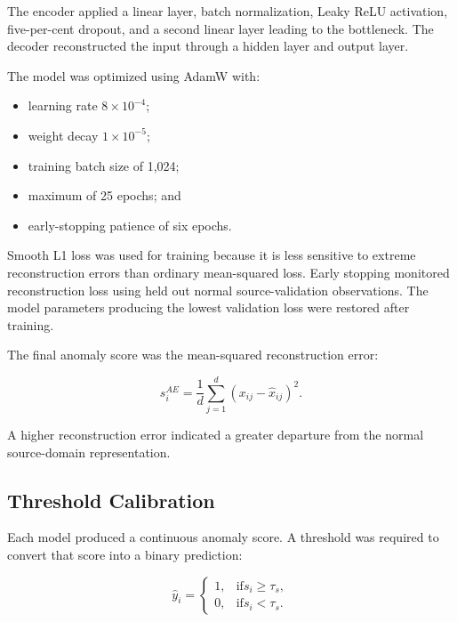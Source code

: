 The encoder applied a linear layer, batch normalization, Leaky ReLU activation, five-per-cent dropout, and a second linear layer leading to the bottleneck. The decoder reconstructed the input through a hidden layer and output layer.

The model was optimized using AdamW with:

\begin{itemize}
       \item learning rate  \(8\times10^{-4}\);
       \item weight decay \(1\times10^{-5}\);
       \item training batch size of 1,024;
       \item maximum of 25 epochs; and
       \item early-stopping patience of six epochs.
\end{itemize}

Smooth L1 loss was used for training because it is less sensitive to extreme reconstruction errors than ordinary mean-squared  loss.
Early stopping monitored reconstruction loss using held out normal source-validation observations. The model parameters producing the lowest validation loss were restored after training.

The final anomaly score was the mean-squared reconstruction error:

\begin{equation}
       s_i^{AE} =
       \frac{1}{d}
       \sum_{j=1}^{d}
       \left(x_{ij}-\hat{x}_{ij}\right)^2.
\label{eq:method-ae-score}
\end{equation}

A higher reconstruction error indicated a greater departure from the normal source-domain representation.

\subsection{Threshold Calibration}
\label{subsec:method-threshold-calibration}

Each model produced a continuous anomaly score. A threshold was required to convert that score into a binary prediction:

\begin{equation}
       \hat{y}_i = 
       \begin{cases}
             1, & \text{if} s_i \geq \tau_s, \\
             0, & \text{if} s_i < \tau_s.
       \end {cases}
       \label{eq:method-decision-rule}
\end{equation}


